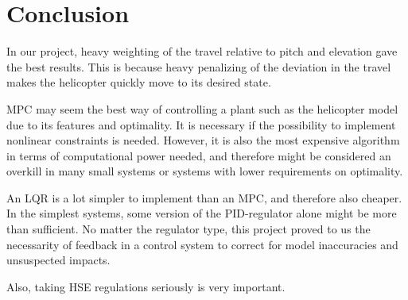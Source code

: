 \section{Conclusion}\label{sec:conclusion}
In our project, heavy weighting of the travel relative to pitch and elevation gave the best results. This is because heavy penalizing of the deviation in the travel makes the helicopter quickly move to its desired state.

MPC may seem the best way of controlling a plant such as the helicopter model due to its features and optimality. It is necessary if the possibility to implement nonlinear constraints is needed. However, it is also the most expensive algorithm in terms of computational power needed, and therefore might be considered an overkill in many small systems or systems with lower requirements on optimality.

An LQR is a lot simpler to implement than an MPC, and therefore also cheaper. In the simplest systems, some version of the PID-regulator alone might be more than sufficient. No matter the regulator type, this project proved to us the necessarity of feedback in a control system to correct for model inaccuracies and unsuspected impacts.

Also, taking HSE regulations seriously is very important.